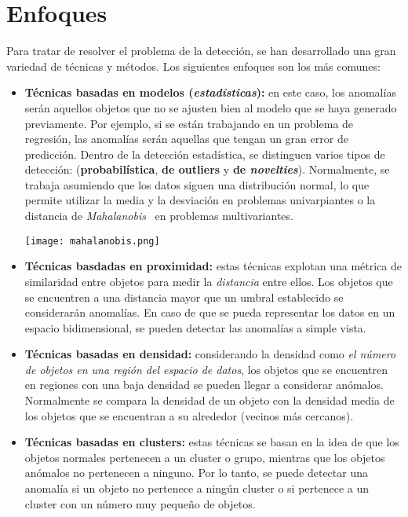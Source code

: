 \section{Enfoques}
Para tratar de resolver el problema de la detección, se han desarrollado una gran variedad de
técnicas y métodos. Los siguientes enfoques son los más comunes:
\begin{itemize}[topsep=0pt]
	\item \textbf{Técnicas basadas en modelos (\textit{estadísticas}):} en este caso, los anomalías serán
		aquellos objetos que no se ajusten bien al modelo que se haya generado previamente. Por ejemplo,
		si se están trabajando en un problema de regresión, las anomalías serán aquellas que tengan un
		gran error de predicción. Dentro de la detección estadística, se distinguen varios tipos de detección:
		(\textbf{probabilística}, \textbf{de outliers} y \textbf{de \textit{novelties}}). Normalmente, se
		trabaja asumiendo que los datos siguen una distribución normal, lo que permite utilizar la media y la
		desviación en problemas univarpiantes o la distancia de \emph{Mahalanobis}~\cite{mahalanobis2018generalized}
		en problemas multivariantes.

		\begin{minipage}{\linewidth}
			\centering
			\texttt{[image: mahalanobis.png]}
			\label{fig:fig2}
		\end{minipage}
	\item \textbf{Técnicas basdadas en proximidad:} estas técnicas explotan una métrica de
		similaridad entre objetos para medir la \textit{distancia} entre ellos. Los objetos que
		se encuentren a una distancia mayor que un umbral establecido se considerarán anomalías.
		En caso de que se pueda representar los datos en un espacio bidimensional, se pueden
		detectar las anomalías a simple vista.
	\item \textbf{Técnicas basadas en densidad:} considerando la densidad como \emph{el número de
		objetos en una región del espacio de datos}, los objetos que se encuentren en regiones
		con una baja densidad se pueden llegar a considerar anómalos. Normalmente se compara la
		densidad de un objeto con la densidad media de los objetos que se encuentran a su alrededor
		(vecinos más cercanos).
	\item \textbf{Técnicas basadas en clusters:} estas técnicas se basan en la idea de que los
		objetos normales pertenecen a un cluster o grupo, mientras que los objetos anómalos no
		pertenecen a ninguno. Por lo tanto, se puede detectar una anomalía si un objeto no pertenece
		a ningún cluster o si pertenece a un cluster con un número muy pequeño de objetos.
\end{itemize}

